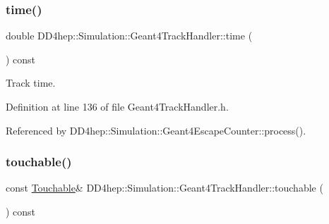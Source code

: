 \hypertarget{class_d_d4hep_1_1_simulation_1_1_geant4_track_handler_aaa1df8165c645a9aae1f959d77a191ce}{}\label{class_d_d4hep_1_1_simulation_1_1_geant4_track_handler_aaa1df8165c645a9aae1f959d77a191ce} 
\subsubsection{\texorpdfstring{time()}{time()}}
{\footnotesize\ttfamily double D\+D4hep\+::\+Simulation\+::\+Geant4\+Track\+Handler\+::time (\begin{DoxyParamCaption}{ }\end{DoxyParamCaption}) const\hspace{0.3cm}{\ttfamily [inline]}}



Track time. 



Definition at line 136 of file Geant4\+Track\+Handler.\+h.



Referenced by D\+D4hep\+::\+Simulation\+::\+Geant4\+Escape\+Counter\+::process().

\hypertarget{class_d_d4hep_1_1_simulation_1_1_geant4_track_handler_aa092449d256643f453e7339ad7fa4417}{}\label{class_d_d4hep_1_1_simulation_1_1_geant4_track_handler_aa092449d256643f453e7339ad7fa4417} 
\subsubsection{\texorpdfstring{touchable()}{touchable()}}
{\footnotesize\ttfamily const \hyperlink{class_d_d4hep_1_1_simulation_1_1_geant4_track_handler_a7db438397a8ccd838ba7bf5fe1b75bdb}{Touchable}\& D\+D4hep\+::\+Simulation\+::\+Geant4\+Track\+Handler\+::touchable (\begin{DoxyParamCaption}{ }\end{DoxyParamCaption}) const\hspace{0.3cm}{\ttfamily [inline]}}




